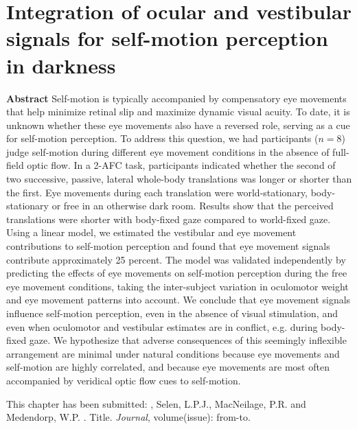 
\thispagestyle{empty}

\chapter{Integration of ocular and vestibular signals for self-motion perception in darkness}
\chaptermark{}

\newpage

\small {\bf Abstract} Self-motion is typically accompanied by compensatory eye movements that help minimize retinal slip and maximize dynamic visual acuity. To date, it is unknown whether these eye movements also have a reversed role, serving as a cue for self-motion perception. To address this question, we had participants ($n=8$) judge self-motion during different eye movement conditions in the absence of full-field optic flow.  In a 2-AFC task, participants indicated whether the second of two successive, passive, lateral whole-body translations was longer or shorter than the first. Eye movements during each translation were world-stationary, body-stationary or free in an otherwise dark room. Results show that the perceived translations were shorter with body-fixed gaze compared to world-fixed gaze. Using a linear model, we estimated the vestibular and eye movement contributions to self-motion perception and found that eye movement signals contribute approximately 25 percent. The model was validated independently by predicting the effects of eye movements on self-motion perception during the free eye movement conditions, taking the inter-subject variation in oculomotor weight and eye movement patterns into account. We conclude that eye movement signals influence self-motion perception, even in the absence of visual stimulation, and even when oculomotor and vestibular estimates are in conflict, e.g. during body-fixed gaze. We hypothesize that adverse consequences of this seemingly inflexible arrangement are minimal under natural conditions because eye movements and self-motion are highly correlated, and because eye movements are most often accompanied by veridical optic flow cues to self-motion.

\vfill

\noindent\underline{ \hspace{4cm} }

\noindent This chapter has been submitted:\newline
{}, Selen, L.P.J., MacNeilage, P.R. and Medendorp, W.P. \citeyear{clemens2015a}. Title. \emph{Journal}, volume(issue): from-to. \newline

\newpage






